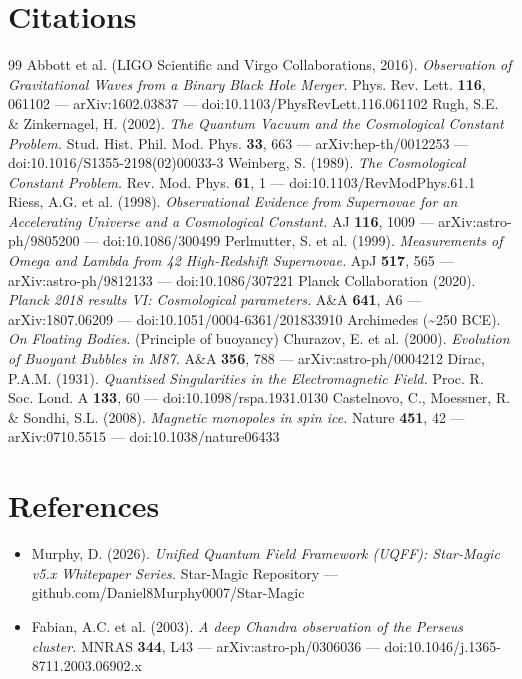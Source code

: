 \documentclass[12pt,a4paper]{article}
\begin{document}
\section*{Citations}
\begin{thebibliography}{99}
 Abbott et al. (LIGO Scientific and Virgo Collaborations, 2016). \emph{Observation of Gravitational Waves from a Binary Black Hole Merger.} Phys. Rev. Lett. \textbf{116}, 061102 --- arXiv:1602.03837 --- doi:10.1103/PhysRevLett.116.061102
 Rugh, S.E. \& Zinkernagel, H. (2002). \emph{The Quantum Vacuum and the Cosmological Constant Problem.} Stud. Hist. Phil. Mod. Phys. \textbf{33}, 663 --- arXiv:hep-th/0012253 --- doi:10.1016/S1355-2198(02)00033-3
 Weinberg, S. (1989). \emph{The Cosmological Constant Problem.} Rev. Mod. Phys. \textbf{61}, 1 --- doi:10.1103/RevModPhys.61.1
 Riess, A.G. et al. (1998). \emph{Observational Evidence from Supernovae for an Accelerating Universe and a Cosmological Constant.} AJ \textbf{116}, 1009 --- arXiv:astro-ph/9805200 --- doi:10.1086/300499
 Perlmutter, S. et al. (1999). \emph{Measurements of Omega and Lambda from 42 High-Redshift Supernovae.} ApJ \textbf{517}, 565 --- arXiv:astro-ph/9812133 --- doi:10.1086/307221
 Planck Collaboration (2020). \emph{Planck 2018 results VI: Cosmological parameters.} A\&A \textbf{641}, A6 --- arXiv:1807.06209 --- doi:10.1051/0004-6361/201833910
 Archimedes (\textasciitilde{}250 BCE). \emph{On Floating Bodies.} (Principle of buoyancy)
 Churazov, E. et al. (2000). \emph{Evolution of Buoyant Bubbles in M87.} A\&A \textbf{356}, 788 --- arXiv:astro-ph/0004212
 Dirac, P.A.M. (1931). \emph{Quantised Singularities in the Electromagnetic Field.} Proc. R. Soc. Lond. A \textbf{133}, 60 --- doi:10.1098/rspa.1931.0130
 Castelnovo, C., Moessner, R. \& Sondhi, S.L. (2008). \emph{Magnetic monopoles in spin ice.} Nature \textbf{451}, 42 --- arXiv:0710.5515 --- doi:10.1038/nature06433
\end{thebibliography}

\section*{References}
\begin{itemize}
  \item[2.] Murphy, D. (2026). \emph{Unified Quantum Field Framework (UQFF): Star-Magic v5.x Whitepaper Series.} Star-Magic Repository --- github.com/Daniel8Murphy0007/Star-Magic
  \item[10.] Fabian, A.C. et al. (2003). \emph{A deep Chandra observation of the Perseus cluster.} MNRAS \textbf{344}, L43 --- arXiv:astro-ph/0306036 --- doi:10.1046/j.1365-8711.2003.06902.x
\end{itemize}
\end{document}
